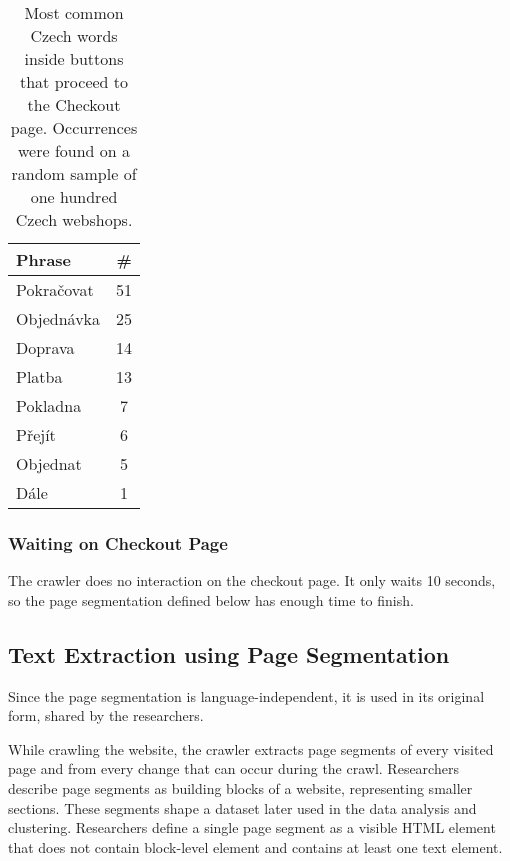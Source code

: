         \begin{table}[h!]
            \centering
            \begin{tabular}{l | c} 
            \textbf{Phrase} & \textbf{\#} \\ [0.5ex] 
            \hline
            Pokračovat & 51 \\ \hline
            Objednávka & 25 \\ \hline
            Doprava & 14 \\ \hline
            Platba & 13 \\ \hline
            Pokladna & 7 \\ \hline
            Přejít & 6 \\ \hline
            Objednat & 5 \\ \hline
            Dále & 1 \\ [1ex] 
            \end{tabular}
            \caption{Most common Czech words inside buttons that proceed to the Checkout page. Occurrences were found on a random sample of one hundred Czech webshops.}
            \label{table:add-to-cart-phrases}
        \end{table}

    \subsubsection*{Waiting on Checkout Page}
        The crawler does no interaction on the checkout page. It only waits 10 seconds, so the page segmentation defined below has enough time to finish.

    \subsection{Text Extraction using Page Segmentation}
    \label{section:text-extraction}
    Since the page segmentation is language-independent, it is used in its original form, shared by the researchers. 
    
    While crawling the website, the crawler extracts page segments of every visited page and from every change that can occur during the crawl. Researchers describe page segments as building blocks of a website, representing smaller sections. These segments shape a dataset later used in the data analysis and clustering. Researchers define\cite{dark-patterns-at-scale} a single page segment as a visible HTML element that does not contain block-level element\cite{block-element} and contains at least one text element\cite{text-element}. 
    

